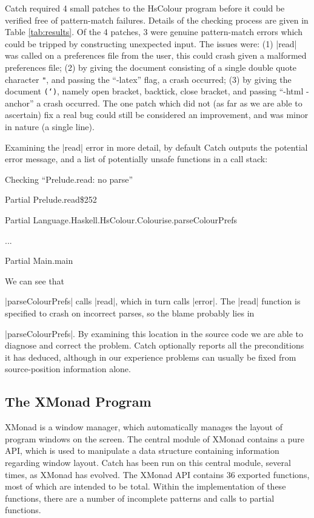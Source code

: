 \documentclass[preprint]{sigplanconf}
\begin{document}
Catch required 4 small patches to the HsColour program before it could be verified free of pattern-match failures. Details of the checking process are given in Table \ref{tab:results}. Of the 4 patches, 3 were genuine pattern-match errors which could be tripped by constructing unexpected input. The issues were: (1) |read| was called on a preferences file from the user, this could crash given a malformed preferences file; (2) by giving the document consisting of a single double quote character \texttt{"}, and passing the ``-latex'' flag, a crash occurred; (3) by giving the document \texttt{(`)}, namely open bracket, backtick, close bracket, and passing ``-html -anchor'' a crash occurred. The one patch which did not (as far as we are able to ascertain) fix a real bug could still be considered an improvement, and was minor in nature (a single line).

Examining the |read| error in more detail, by default Catch outputs the potential error message, and a list of potentially unsafe functions in a call stack:

\smallskip
\par\noindent\textsf{Checking ``Prelude.read: no parse''}
\par\noindent\textsf{Partial Prelude.read\$252}
\par\noindent\textsf{Partial Language.Haskell.HsColour.Colourise.parseColourPrefs}
\par\noindent\textsf{...}
\par\noindent\textsf{Partial Main.main}
\smallskip

We can see that \ignore|parseColourPrefs| calls |read|, which in turn calls |error|. The |read| function is specified to crash on incorrect parses, so the blame probably lies in \ignore|parseColourPrefs|. By examining this location in the source code we are able to diagnose and correct the problem. Catch optionally reports all the preconditions it has deduced, although in our experience problems can usually be fixed from source-position information alone.

\subsection{The XMonad Program}
\label{sec:xmonad}

XMonad \cite{xmonad} is a window manager, which automatically manages the layout of program windows on the screen. The central module of XMonad contains a pure API, which is used to manipulate a data structure containing information regarding window layout. Catch has been run on this central module, several times, as XMonad has evolved. The XMonad API contains 36 exported functions, most of which are intended to be total. Within the implementation of these functions, there are a number of incomplete patterns and calls to partial functions.
\end{document}
